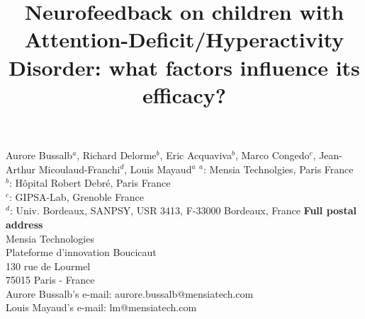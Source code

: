 

\title{Neurofeedback on children with Attention-Deficit/Hyperactivity Disorder: what factors influence its efficacy?} %
\maketitle
Aurore Bussalb$^a$, Richard Delorme$^b$, Eric Acquaviva$^b$, Marco Congedo$^c$, Jean-Arthur Micoulaud-Franchi$^d$, Louis Mayaud$^a$ 
\smallbreak
\noindent $^a$: Mensia Technolgies, Paris France \\
\noindent $^b$: Hôpital Robert Debré, Paris France \\ %
\noindent $^c$: GIPSA-Lab, Grenoble France \\
\noindent $^d$: Univ. Bordeaux, SANPSY, USR 3413, F-33000 Bordeaux, France 
\smallbreak
\noindent\textbf{Full postal address} \\
Mensia Technologies \\
Plateforme d'innovation Boucicaut \\
130 rue de Lourmel \\
75015 Paris - France \\
Aurore Bussalb's e-mail: aurore.bussalb@mensiatech.com \\
Louis Mayaud's e-mail: lm@mensiatech.com 